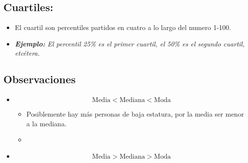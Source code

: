 \subsection{Cuartiles:}
\begin{itemize}
    \item El cuartil son percentiles partidos en cuatro a lo largo del numero 1-100.
    \item \emph{\textbf{Ejemplo: }El percentil 25\% es el primer cuartil, el 50\% es el segundo cuartil, etcétera.}
\end{itemize}


\subsection{Observaciones}
\begin{itemize}
    \item \[
      \text{Media} < \text{Mediana} < \text{Moda}  
    \]
        \begin{itemize}
            \item Posiblemente hay más personas de baja estatura, por la media ser menor a la mediana.
            \item 
        \end{itemize}
    
    \item \[
        \text{Media} > \text{Mediana} > \text{Moda}  
    \]
\end{itemize}
